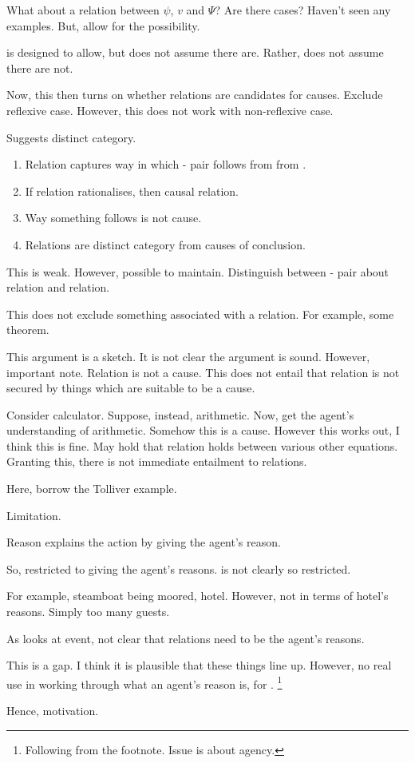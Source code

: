 \begin{note}
  What about a relation between \(\psi\), \(v\) and \(\Psi\)?
  Are there cases?
  Haven't seen any examples.
  But, allow for the possibility.

  \qWhy{} is designed to allow, but does not assume there are.
  Rather, does not assume there are not.

  Now, this then turns on whether relations are candidates for causes.
  Exclude reflexive case.
  However, this does not work with non-reflexive case.

  Suggests distinct category.

  \begin{enumerate}
  \item
    Relation captures way in which - pair follows from \pool{} from \agpe{}.
  \item
    If relation rationalises, then causal relation.
  \item
    Way something follows is not cause.
  \item
    Relations are distinct category from causes of conclusion.
  \end{enumerate}

  This is weak.
  However, possible to maintain.
  Distinguish between - pair about relation and relation.

  This does not exclude something associated with a relation.
  For example, some theorem.

  This argument is a sketch.
  It is not clear the argument is sound.
  However, important note.
  Relation is not a cause.
  This does not entail that relation is not secured by things which are suitable to be a cause.

  Consider calculator.
  Suppose, instead, arithmetic.
  Now, get the agent's understanding of arithmetic.
  Somehow this is a cause.
  However this works out, I think this is fine.
  May hold that relation holds between various other equations.
  Granting this, there is not immediate entailment to relations.

  Here, borrow the Tolliver example.
\end{note}


\begin{note}
  Limitation.

  Reason explains the action by giving the agent's reason.

  So, restricted to giving the agent's reasons.
  \qWhy{} is not clearly so restricted.

  For example, steamboat being moored, hotel.
  However, not in terms of hotel's reasons.
  Simply too many guests.

  As \qWhy{} looks at event, not clear that relations need to be the agent's reasons.

  This is a gap.
  I think it is plausible that these things line up.
  However, no real use in working through what an agent's reason is, for \citeauthor{Davidson:1963aa}.%
  \footnote{
    Following from the footnote.
    Issue is about agency.
  }

  Hence, motivation.
\end{note}

